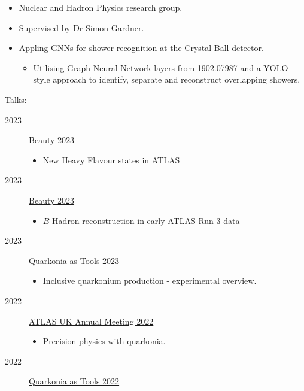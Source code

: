 \documentclass[10pt]{article}
\begin{document}
\begin{bgbox}[height=\paperheight,colback=gray,width=0.7\textwidth]
\begin{description}
\begin{description}
            \begin{itemize}
                \item Nuclear and Hadron Physics research group.
                \item Supervised by Dr Simon Gardner.
                \item Appling GNNs for shower recognition at the Crystal Ball detector.
                \begin{itemize}
                    \item Utilising Graph Neural Network layers from \href{https://arxiv.org/abs/1902.07987}{1902.07987} and a YOLO-style approach to identify, separate and reconstruct overlapping showers.
                \end{itemize}
            \end{itemize}
        \end{description}
        \item \underline{Talks}:
        \begin{description}
            \item[2023] \href{https://indico.in2p3.fr/event/28579/}{Beauty 2023}
            \begin{itemize}
                \item New Heavy Flavour states in ATLAS
            \end{itemize}
            \item[2023] \href{https://indico.in2p3.fr/event/28579/}{Beauty 2023}
            \begin{itemize}
                \item $B$-Hadron reconstruction in early ATLAS Run 3 data
            \end{itemize}
            \item[2023] \href{https://indico.cern.ch/event/1213416/}{Quarkonia as Tools 2023}
            \begin{itemize}
                \item Inclusive quarkonium production - experimental overview. 
            \end{itemize}
            \item[2022] \href{https://indico.cern.ch/event/1077305/}{ATLAS UK Annual Meeting 2022}
            \begin{itemize}
                \item Precision physics with quarkonia.
            \end{itemize}
            \item[2022] \href{https://indico.cern.ch/event/1084752/}{Quarkonia as Tools 2022}

\end{description}
\end{description}
\end{bgbox}
\end{document}

